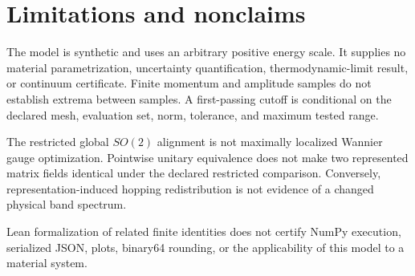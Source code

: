 \section{Limitations and nonclaims}

The model is synthetic and uses an arbitrary positive energy scale.  It supplies no
material parametrization, uncertainty quantification, thermodynamic-limit result, or
continuum certificate.  Finite momentum and amplitude samples do not establish extrema
between samples.  A first-passing cutoff is conditional on the declared mesh, evaluation
set, norm, tolerance, and maximum tested range.

The restricted global $SO(2)$ alignment is not maximally localized Wannier gauge
optimization.  Pointwise unitary equivalence does not make two represented matrix fields
identical under the declared restricted comparison.  Conversely, representation-induced
hopping redistribution is not evidence of a changed physical band spectrum.

Lean formalization of related finite identities does not certify NumPy execution,
serialized JSON, plots, binary64 rounding, or the applicability of this model to a
material system.
